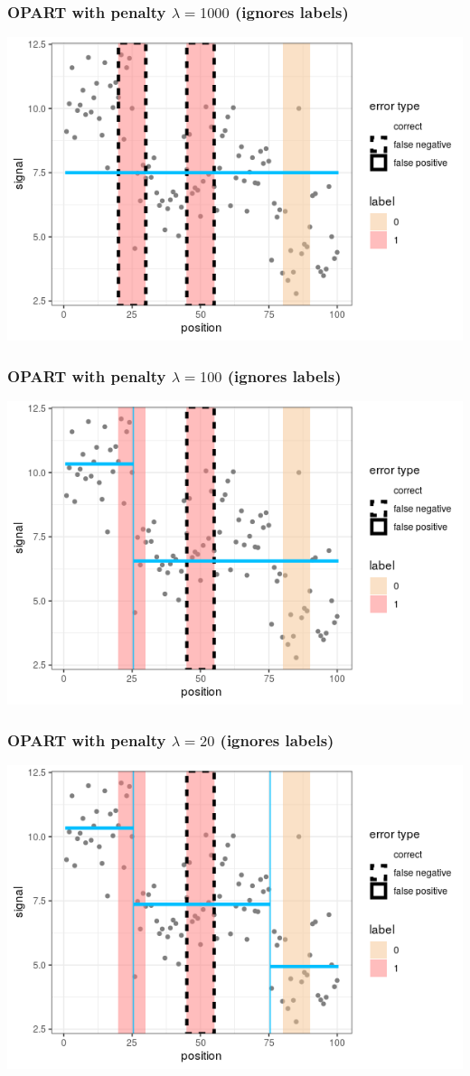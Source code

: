 
\begin{frame}
  \frametitle{OPART with penalty $\lambda=1000$ (ignores labels)}
  \includegraphics[width=\textwidth]{figure-baselines-penalty=1000.png}
\end{frame}


\begin{frame}
  \frametitle{OPART with penalty $\lambda=100$ (ignores labels)}
  \includegraphics[width=\textwidth]{figure-baselines-penalty=100.png}
\end{frame}


\begin{frame}
  \frametitle{OPART with penalty $\lambda=20$ (ignores labels)}
  \includegraphics[width=\textwidth]{figure-baselines-penalty=20.png}
\end{frame}


